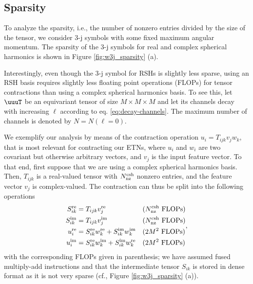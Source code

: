 \subsection{Sparsity}
\label{appdx:w3j_rsph_sparsity}

To analyze the sparsity, i.e., the number of nonzero entries divided by the size of the tensor, we consider 3-j symbols with some fixed maximum angular momentum.
The sparsity of the 3-j symbols for real and complex spherical harmonics is shown in Figure \ref{fig:w3j_sparsity} (a).

Interestingly, even though the 3-j symbol for RSHs is slightly less sparse, using an RSH basis requires slightly less floating point operations (FLOPs) for tensor contractions than using a complex spherical harmonics basis.
To see this, let $\uuuT$ be an equivariant tensor of size $M\times M\times M$ and let its channels decay with increasing $\ell$ according to eq. \eqref{eq:decay-channels}.
The maximum number of channels is denoted by $N = N(\ell = 0)$.

We exemplify our analysis by means of the contraction operation $u_i = T_{ijk} v_j w_k$, that is most relevant for contracting our ETNs, where $u_i$ and $w_i$ are two covariant but otherwise arbitrary vectors, and $v_j$ is the input feature vector.
To that end, first suppose that we are using a complex spherical harmonics basis.
Then, $T_{ijk}$ is a real-valued tensor with $N_{\rm nz}^{\rm csh}$ nonzero entries, and the feature vector $v_j$ is complex-valued.
The contraction can thus be split into the following operations
\begin{equation}\label{eq:instructions-tensor-contraction}
    \begin{aligned}
        S_{ik}^{\rm re} &= T_{ijk} v_j^{\rm re} && \text{($N_{\rm nz}^{\rm csh}$ FLOPs)} \\
        S_{ik}^{\rm im} &= T_{ijk} v_j^{\rm im} && \text{($N_{\rm nz}^{\rm csh}$ FLOPs)} \\
        u_i^{\rm re}    &= S_{ik}^{\rm re} w_k^{\rm re} + S_{ik}^{\rm im} w_k^{\rm im} && \text{($2M^2$ FLOPs)} \\
        u_i^{\rm im}    &= S_{ik}^{\rm re} w_k^{\rm im} + S_{ik}^{\rm im} w_k^{\rm re} && \text{($2M^2$ FLOPs)}
    \end{aligned}
    ,
\end{equation}
with the corresponding FLOPs given in parenthesis;
we have assumed fused multiply-add instructions and that the intermediate tensor $S_{ik}$ is stored in dense format as it is not very sparse (cf., Figure \ref{fig:w3j_sparsity} (a)).

